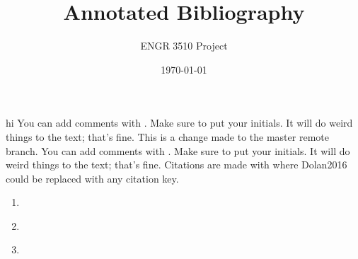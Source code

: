 \documentclass[12pt,letterpaper]{article}
\begin{document}
\title{Annotated Bibliography}
\author{ENGR 3510 Project}
\date{\today}
\maketitle

hi You can add comments with . Make sure to put your initials. It will do weird things to the text; that's fine. 
This is a change made to the master remote branch.
You can add comments with . Make sure to put your initials. It will do weird things to the text; that's fine. 
Citations are made with \cite{Dolan2016} where Dolan2016 could be replaced with any citation key. 


\begin{enumerate}
	\item  \cite{Dolan2016} 
	\item \cite{J.EllisBell2015} 
	\item \cite{Nan2013}
\end{enumerate}

\printbibliography
\end{document}
